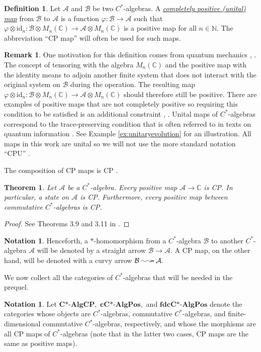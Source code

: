 \documentclass[12pt]{article}
\makeatletter
\theoremstyle{theorem}
\newtheorem{theorem}[equation]{Theorem}
\theoremstyle{definition}
\newtheorem{definition}[equation]{Definition}
\newtheorem{remark}[equation]{Remark}
\newtheorem{notation}[equation]{Notation}
\numberwithin{equation}{section}
\let\C=\Chi \let\W=\Omega
\def\vf{\varphi}
\newcommand{\bt}{\begin{theorem}}
\newcommand{\et}{\end{theorem}}
\newcommand{\bd}{\begin{definition}}
\newcommand{\ed}{\end{definition}}
\newcommand{\bprf}{\begin{proof}}
\newcommand{\eprf}{\end{proof}}
\newcommand{\br}{\begin{remark}}
\newcommand{\er}{\end{remark}}
\newcommand{\<}{\langle}
\renewcommand{\>}{\rangle}
\newcommand{\id}{\mathrm{id}}
\def\C{{{\mathbb C}}}
\def\N{{{\mathbb N}}}
\newcommand{\CPCAlg}{\mathbf{C\text{*-}AlgCP}}
\newcommand{\cCAlgPos}{\mathbf{cC\text{*-}AlgPos}}
\newcommand{\fdcCAlgPos}{\mathbf{fdcC\text{*-}AlgPos}}
\def\mA{{{\mathcal{A}}}}
\def\mB{{{\mathcal{B}}}}
\newcommand{\stoch}{\;\xy0;/r.25pc/:\ar@{~>}(3,0);(-3,0);\endxy\;}
\makeatother
\begin{document}
\bd
\label{defn:CPU}
Let $\mA$ and $\mB$ be two $C^*$-algebras. 
A \emph{\uline{completely positive (unital) map}} from $\mB$ to $\mA$ is a 
function $\varphi:\mB\to\mA$ such that 
$\vf\otimes\id_{n}:\mB\otimes M_{n}(\C)\to\mA\otimes M_{n}(\C)$
is a positive map for all $n\in\N.$ The abbreviation ``CP map'' will often be used
for such maps.
\ed

\br
One motivation for this definition comes from
quantum mechanics \cite{Li76}, \cite{Kr83}. 
The concept of tensoring with the algebra
$M_{n}(\C)$ and the positive map with the identity 
means to adjoin another finite system that does not interact
with the original system on $\mB$ during the operation. The resulting map 
$\vf\otimes\id_{n}:\mB\otimes M_{n}(\C)\to\mA\otimes M_{n}(\C)$
should therefore still be positive. There are examples of positive
maps that are not completely positive so requiring this condition to be
satisfied is an additional constraint \cite{Pa03}, \cite{Kr83}.
Unital maps of $C^*$-algebras correspond to the trace-preserving
condition that is often referred to in texts on quantum information
\cite{NiCh10}. See Example \ref{ex:unitaryevolution} for an illustration. 
All maps in this work are unital so we will not use the
more standard notation ``CPU'' \cite{NiCh10}.
\er

The composition of CP maps is CP \cite{Pa03}. 

\bt
\label{thm:positivebetweencommutative}
Let $\mA$ be a $C^*$-algebra. 
Every positive map $\mA\to\C$ is CP.
In particular, a state on $\mA$ is CP.
Furthermore, every positive map between commutative $C^*$-algebras
is CP.
\et

\bprf
See Theorems 3.9 and 3.11 in \cite{Pa03}.
\eprf

\begin{notation}
\label{not:starhomoandCP}
Henceforth, a $*$-homomorphism from a $C^*$-algebra $\mB$ to 
another $C^*$-algebra $\mA$ will be denoted by a 
straight arrow $\mB\to\mA.$ A CP map, 
on the other hand, will be denoted with a curvy arrow
$\mB\stoch\mA.$ 
\end{notation}

We now collect all the categories of $C^*$-algebras that will be needed
in the prequel. 

\begin{notation}
\label{defn:CPCAlg}
Let $\CPCAlg,$ $\cCAlgPos,$ and $\fdcCAlgPos$ denote the categories whose 
objects are $C^*$-algebras, commutative $C^*$-algebras, 
and finite-dimensional commutative $C^*$-algebras, respectively, 
and whose the morphisms are all CP maps of $C^*$-algebras
(note that in the latter two cases, CP maps are the same as 
positive maps). 
\end{notation}
\end{document}
